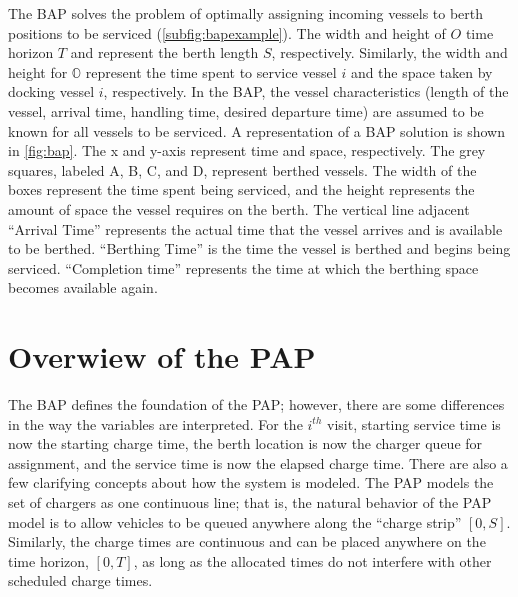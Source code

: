 \documentclass[ee,msthesis]{usuthesis}
\begin{document}
The BAP solves the problem of optimally assigning incoming vessels to berth positions to be serviced
(\autoref{subfig:bapexample}). The width and height of \(O\) time horizon \(T\) and represent the berth length \(S\),
respectively. Similarly, the width and height for \(\mathbb{O}\) represent the time spent to service vessel \(i\) and the
space taken by docking vessel \(i\), respectively. In the BAP, the vessel characteristics (length of the vessel, arrival
time, handling time, desired departure time) are assumed to be known for all vessels to be serviced. A representation of
a BAP solution is shown in \autoref{fig:bap}. The x and y-axis represent time and space, respectively. The grey squares,
labeled A, B, C, and D, represent berthed vessels. The width of the boxes represent the time spent being serviced, and
the height represents the amount of space the vessel requires on the berth. The vertical line adjacent
 ``Arrival Time'' represents the actual
time that the vessel arrives and is available to be berthed. ``Berthing Time'' is the time the vessel is berthed and
begins being serviced. ``Completion time'' represents the time at which the berthing space becomes available again.

\section{Overwiew of the PAP}
\label{sec:overview-of-the-pap}
The BAP defines the foundation of the PAP; however, there are some differences in the way the variables are interpreted. For
the \(i^{th}\) visit, starting service time is now the starting charge time, the berth location is now the charger queue
for assignment, and the service time is now the elapsed charge time. There are also a few clarifying concepts about how
the system is modeled. The PAP models the set of chargers as one continuous line; that is, the natural behavior of the
PAP model is to allow vehicles to be queued anywhere along the ``charge strip'' \([0,S]\). Similarly, the charge times are
continuous and can be placed anywhere on the time horizon, \([0,T]\), as long as the allocated times do not interfere with
other scheduled charge times.
\end{document}

